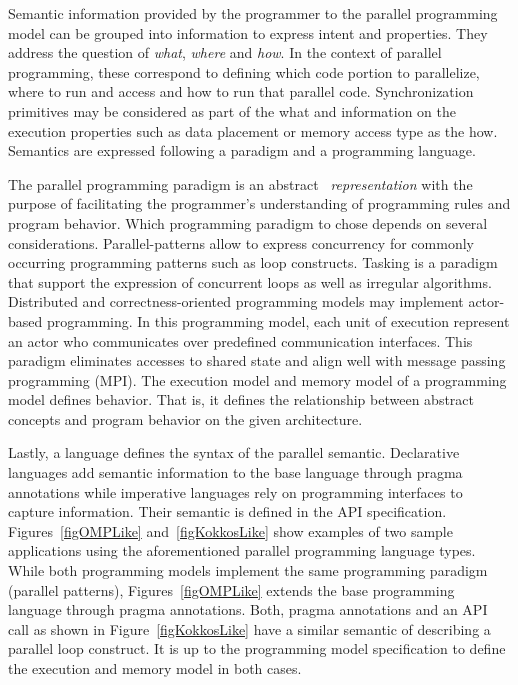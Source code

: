 Semantic information provided by the programmer to the parallel programming model can be grouped into information to express intent and properties. They address the question of \emph{what}, \emph{where} and \emph{how}. In the context of parallel programming, these correspond to defining which code portion to parallelize, where to run and access and how to run that parallel code. Synchronization primitives may be considered as part of the what and information on the execution properties such as data placement or memory access type as the how. Semantics are expressed following a paradigm and a programming language.

The parallel programming paradigm is an abstract ~\emph{representation} with the purpose of facilitating the programmer's understanding of programming rules and program behavior. Which programming paradigm to chose depends on several considerations. Parallel-patterns allow to express concurrency for commonly occurring programming patterns such as loop constructs. Tasking is a paradigm that support the expression of concurrent loops as well as irregular algorithms. Distributed and correctness-oriented programming models may implement actor-based programming. In this programming model, each unit of execution represent an actor who communicates over predefined communication interfaces. This paradigm eliminates accesses to shared state and align well with message passing programming (MPI). The execution model and memory model of a programming model defines behavior. That is, it defines the relationship between abstract concepts and program behavior on the given architecture.

Lastly, a language defines the syntax of the parallel semantic. Declarative languages add semantic information to the base language through pragma annotations while imperative languages rely on programming interfaces to capture information. Their semantic is defined in the API specification. Figures~\ref{figOMPLike} and~\ref{figKokkosLike} show examples of two sample applications using the aforementioned parallel programming language types. While both programming models implement the same programming paradigm (parallel patterns), Figures~\ref{figOMPLike} extends the base programming language through pragma annotations. Both, pragma annotations and an API call as shown in Figure~\ref{figKokkosLike} have a similar semantic of describing a parallel loop construct. It is up to the programming model specification to define the execution and memory model in both cases. 

